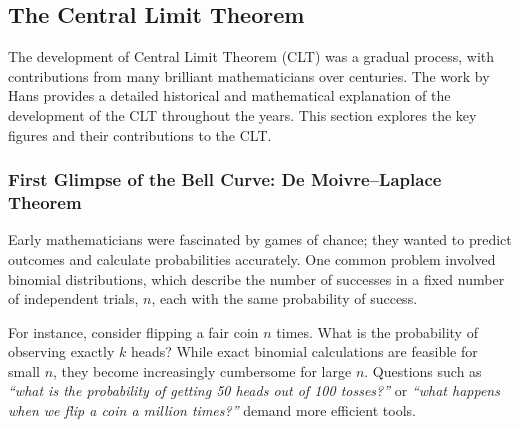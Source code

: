 

\subsection{The Central Limit Theorem}


The development of Central Limit Theorem (CLT) was a gradual process, with contributions from many brilliant mathematicians over centuries. The work by Hans \cite{fischer2010history} provides a detailed historical and mathematical explanation of the development of the CLT throughout the years. This section explores the key figures and their contributions to the CLT.

\vspace{-0.5em}
\subsubsection{First Glimpse of the Bell Curve: De Moivre–Laplace Theorem}
Early mathematicians were fascinated by games of chance; they wanted to predict outcomes and calculate probabilities accurately. One common problem involved binomial distributions, which describe the number of successes in a fixed number of independent trials, $n$, each with the same probability of success. 


For instance, consider flipping a fair coin \( n \) times. What is the probability of observing exactly \( k \) heads? While exact binomial calculations are feasible for small \( n \), they become increasingly cumbersome for large \( n \). Questions such as \textit{“what is the probability of getting 50 heads out of 100 tosses?”} or \textit{“what happens when we flip a coin a million times?”} demand more efficient tools.

